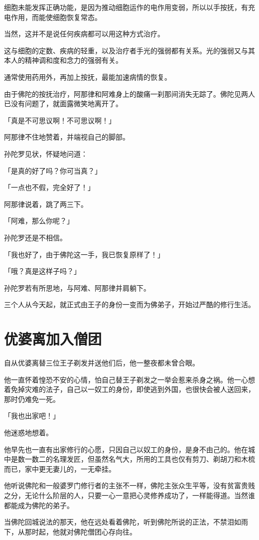 \documentclass[twoside,openany]{book}
\begin{document}
细胞未能发挥正确功能，是因为推动细胞运作的电作用变弱，所以以手按抚，有充电作用，而能使细胞恢复常态。

当然，这并不是说任何疾病都可以用这种方式治疗。

这与细胞的定数、疾病的轻重，以及治疗者手光的强弱都有关系。光的强弱又与其本人的精神调和度和念力的强弱有关。

通常使用药用外，再加上按抚，最能加速病情的恢复。

由于佛陀的按抚治疗，阿那律和阿难身上的酸痛一刹那间消失无踪了。佛陀见两人已没有问题了，就面露微笑地离开了。

「真是不可思议啊！不可思议啊！」

阿那律不住地赞着，并端视自己的脚部。

孙陀罗见状，怀疑地问道：

「是真的好了吗？你可当真？」

「一点也不假，完全好了！」

阿那律说着，跳了两三下。

「阿难，那么你呢？」

孙陀罗还是不相信。

「我也好了，由于佛陀这一手，我已恢复原样了！」

「哦？真是这样子吗？」

孙陀罗若有所思地，与阿难、阿那律并肩躺下。

三个人从今天起，就正式由王子的身份一变而为佛弟子，开始过严酷的修行生活。

\section{优婆离加入僧团}\label{sec9.3}

自从优婆离替三位王子剃发并送他们后，他一整夜都未曾合眼。

他一直怀着惶恐不安的心情，怕自己替王子剃发之一举会惹来杀身之祸。他一心想着免掉灾难的法子，自己以一奴工的身份，即使逃到外国，也很快会被人送回来，那时仍难免一死。

「我也出家吧！」

他迷惑地想着。

他早先也一直有出家修行的心愿，只因自己以奴工的身份，是身不由己的。他在城中是数一数二的名理发匠，但虽然名气大，所用的工具也仅有剪刀、剃胡刀和木梳而已，家中更无妻儿的，一无牵挂。

他听说佛陀和一般婆罗门修行者的主张不一样，佛陀主张众生平等，没有贫富贵贱之分，无论什么阶层的人，只要一心一意把心灵修养成功了，一样能得道。当然谁都能成为佛陀的弟子。

当佛陀回城说法的那天，他在远处看着佛陀，听到佛陀所说的正法，不禁泪如雨下，从那时起，他就对佛陀僧团心存向往。
\end{document}
